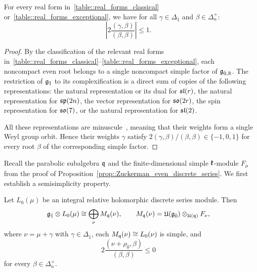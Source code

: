 \begin{lemma}
\label{lemm::odd_root_estimate}
For every real form in~\eqref{table::real_forms_classical} or~\eqref{table::real_forms_exceptional}, we have for all $\gamma \in \Delta_{\bar{1}}$ and $\beta \in \Delta_{n}^{+}$:
\[
\left|2\frac{(\gamma,\beta)}{(\beta,\beta)}\right|
\leq1.
\]
\end{lemma}

\begin{proof}
By the classification of the relevant real forms in~\eqref{table::real_forms_classical}--\eqref{table::real_forms_exceptional}, each noncompact even root belongs to a single noncompact simple factor of $\gg_{\bar0,\RR}$. The restriction of $\odd$ to its complexification is a direct sum of copies of the following representations: the natural representation or its dual for $\sl(r)$, the natural representation for $\sp(2n)$, the vector representation for $\so(2r)$, the spin representation for $\so(7)$, or the natural representation for $\sl(2)$.

All these representations are minuscule~\cite[Chapter~VIII, Section~7.3]{Bourbaki_minuscule}, meaning that their weights form a single Weyl group orbit. Hence their weights $\gamma$ satisfy
$
2(\gamma,\beta)/(\beta,\beta)\in\{-1,0,1\}
$
for every root $\beta$ of the corresponding simple factor.
\end{proof}

Recall the parabolic subalgebra $\qq$ and the finite-dimensional simple $\kk$-module $F_{\mu}$ from the proof of Proposition~\ref{prop::Zuckerman_even_discrete_series}. We first establish a semisimplicity property.

\begin{lemma}\label{lemm::odd_tensor_semisimple}
Let $L_0(\mu)$ be an integral relative holomorphic discrete series module. Then
\[
\odd\otimes L_0(\mu)\cong\bigoplus_{\nu}M_{\qq}(\nu), \qquad M_{\qq}(\nu)=\UE(\even)\otimes_{\UE(\qq)}F_\nu,
\]
where $\nu=\mu+\gamma$ with $\gamma \in \Delta_{\bar{1}}$, each $M_{\qq}(\nu)\cong L_0(\nu)$ is simple, and
\[
2\frac{(\nu+\rho_{\bar0},\beta)}{(\beta,\beta)}\leq0
\]
for every $\beta\in\Delta_n^+$.
\end{lemma}

